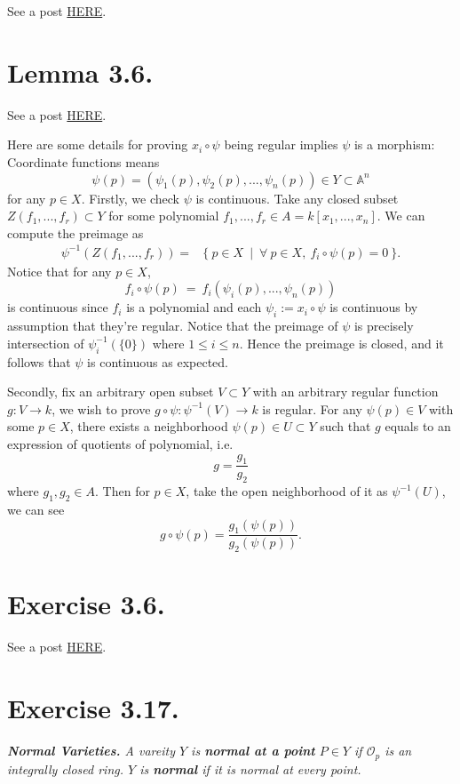 See a post \href{https://math.stackexchange.com/questions/787770/hartshorne-propositon-i-3-3}{HERE}.

\section{Lemma 3.6.}

See a post \href{https://math.stackexchange.com/questions/457328/hartshorne-lemma-i-3-6}{HERE}.

Here are some details for proving $x_i\circ \psi$ being regular implies $\psi$ is a morphism:
Coordinate functions means 
\[\psi(p)=(\psi_1(p),\psi_2(p),...,\psi_n(p))\in Y\subset \mathbb A^n\] for any $p\in X$.
Firstly, we check $\psi$ is continuous. Take any closed subset $Z(f_1,...,f_r)\subset Y$ for some polynomial $f_1,...,f_r\in A=k[x_1,...,x_n]$. We can compute the preimage as \begin{align*}
    \psi^{-1}(Z(f_1,...,f_r)) =& \{~ p\in X ~\mid ~\forall~ p\in X,~ f_i\circ \psi(p)=0 ~\}.
\end{align*}
Notice that for any $p\in X$, \[f_i\circ \psi(p) ~=~ f_i(\psi_i(p),...,\psi_n(p))\] is continuous since $f_i$ is a polynomial and each $\psi_i:=x_i\circ \psi$ is continuous by assumption that they're regular.
Notice that the preimage of $\psi$ is precisely intersection of $\psi_i^{-1}(\{0\})$ where $1\leq i\leq n$. Hence the preimage is closed, and it follows that $\psi$ is continuous as expected. 

Secondly, fix an arbitrary open subset $V\subset Y$ with an arbitrary regular function $g:V\to k$, we wish to prove $g\circ \psi:\psi^{-1}(V)\to k$ is regular. For any $\psi(p)\in V$ with some $p\in X$, there exists a neighborhood $\psi(p)\in U\subset Y$ such that $g$ equals to an expression of quotients of polynomial, i.e. \[g=\frac{g_1}{g_2}\] where $g_1,g_2\in A$. Then for $p\in X$, take the open neighborhood of it as $\psi^{-1}(U)$, we can see 
\[g\circ \psi (p) = \frac{g_1(\psi(p))}{g_2(\psi(p))}.\]

\section{Exercise 3.6.}

See a post \href{https://math.stackexchange.com/questions/2120717/there-are-quasi-affine-varieties-which-are-not-affine#:~:text=I%20see%20this%20sentence%20in,(0%2C0)%7D.}{HERE}.

\section{Exercise 3.17.}
\textit{\textbf{Normal Varieties.} A vareity $Y$ is \textbf{normal at a point} $P\in Y$ if $\mathscr O_p$ is an integrally closed ring. $Y$ is \textbf{normal} if it is normal at every point.}

